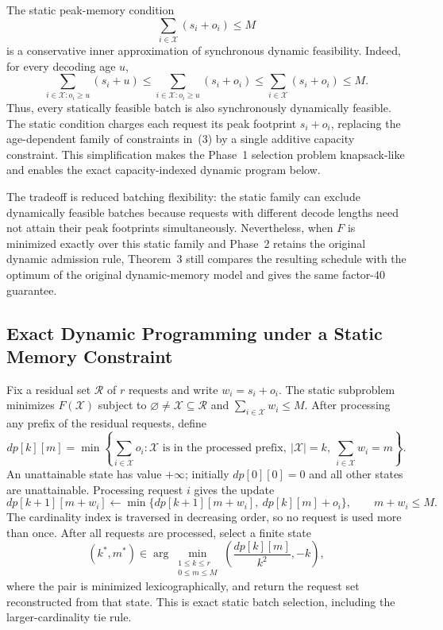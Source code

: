 \documentclass[nonblindrev]{informs3_hide}
\begin{document}
The static peak-memory condition
\[
    \sum_{i\in\mathcal X}(s_i+o_i)\le M
\]
is a conservative inner approximation of synchronous dynamic feasibility.
Indeed, for every decoding age $u$,
\[
    \sum_{i\in\mathcal X:o_i\ge u}(s_i+u)
    \le
    \sum_{i\in\mathcal X:o_i\ge u}(s_i+o_i)
    \le
    \sum_{i\in\mathcal X}(s_i+o_i)
    \le M.
\]
Thus, every statically feasible batch is also synchronously dynamically
feasible. The static condition charges each request its peak footprint
$s_i+o_i$, replacing the age-dependent family of constraints in~(3) by a
single additive capacity constraint. This simplification makes the Phase~1
selection problem knapsack-like and enables the exact capacity-indexed
dynamic program below.

The tradeoff is reduced batching flexibility: the static family can exclude
dynamically feasible batches because requests with different decode lengths
need not attain their peak footprints simultaneously. Nevertheless, when
$F$ is minimized exactly over this static family and Phase~2 retains the
original dynamic admission rule, Theorem~3 still compares the resulting
schedule with the optimum of the original dynamic-memory model and gives the
same factor-$40$ guarantee.

\subsection{Exact Dynamic Programming under a Static Memory Constraint}

Fix a residual set $\mathcal R$ of $r$ requests and write $w_i=s_i+o_i$. The static subproblem minimizes $F(\mathcal X)$ subject to $\varnothing\ne\mathcal X\subseteq\mathcal R$ and $\sum_{i\in\mathcal X}w_i\le M$. After processing any prefix of the residual requests, define
\[
dp[k][m]=\min\left\{\sum_{i\in\mathcal X}o_i:
\mathcal X\text{ is in the processed prefix},\ |\mathcal X|=k,
\ \sum_{i\in\mathcal X}w_i=m\right\}.
\]
An unattainable state has value $+\infty$; initially $dp[0][0]=0$ and all other states are unattainable. Processing request $i$ gives the update
\[
dp[k+1][m+w_i]\leftarrow
\min\{dp[k+1][m+w_i],\ dp[k][m]+o_i\},\qquad m+w_i\le M.
\]
The cardinality index is traversed in decreasing order, so no request is used more than once. After all requests are processed, select a finite state
\[
(k^*,m^*)\in\arg\min_{\substack{1\le k\le r\\0\le m\le M}}
\left(\frac{dp[k][m]}{k^2},-k\right),
\]
where the pair is minimized lexicographically, and return the request set reconstructed from that state. This is exact static batch selection, including the larger-cardinality tie rule.
\end{document}
